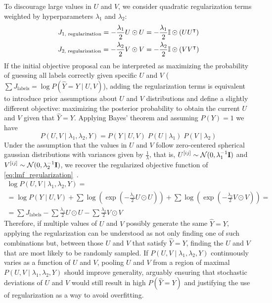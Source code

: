 \begin{apendicesenv}
To discourage large values in $U$ and $V$, we consider quadratic regularization terms weighted by hyperparameters $\lambda_1$ and $\lambda_2$:
%
\begin{gather}
    J_\text{1, regularization}
        = -\frac{\lambda_1}{2} U \odot U
        = -\frac{\lambda_1}{2} \mathbb{I} \odot (UU^\intercal)\\
    J_\text{2, regularization}
        = - \frac{\lambda_2}{2} V \odot V
        = - \frac{\lambda_2}{2} \mathbb{I} \odot (VV^\intercal)
    \label{eq:lmf_regularization}
\end{gather}
%
If the initial objective proposal can be interpreted as maximizing the probability of guessing all labels correctly given specific $U$ and $V$ ($\sum J_\text{labels} = \log P(\hat Y=Y\mid U,V)$), adding the regularization terms is equivalent to introduce prior assumptions about $U$ and $V$ distributions and define a slightly different objective: maximizing the posterior probability to obtain the current $U$ and $V$ given that $\hat Y = Y$. Applying Bayes' theorem and assuming $P(Y) = 1$ we have
%
\begin{equation}
    P(U,V\mid \lambda_1, \lambda_2, Y) = P(Y\mid U,V)\; P(U\mid \lambda_1) \; P(V\mid \lambda_2)
\end{equation}
%
Under the assumption that the values in $U$ and $V$ follow zero-centered spherical gaussian distributions with variances given by $\frac{1}{\lambda}$, that is, $U^{[ij]}\sim\mathcal{N}(0, \lambda_1^{-1}\mathbf{I})$ and $V^{[ij]}\sim\mathcal{N}(0, \lambda_2^{-1}\mathbf{I})$, we recover the regularized objective function of \autoref{eq:lmf_regularization}~\cite{johnsonlogistic}.
%
\begin{multline}
    \log P(U,V\mid \lambda_1, \lambda_2, Y)
    =\\
    = \log P(Y\mid U,V)
        + \sum \log(\exp(-\frac{\lambda_1}{2} U \odot U))
        + \sum \log(\exp(-\frac{\lambda_2}{2} V \odot V))
    =\\
    = \sum J_\text{labels}
        - \sum \frac{\lambda_1}{2} U \odot U
        - \sum \frac{\lambda_2}{2} V \odot V
\end{multline}
%
Therefore, if multiple values of $U$ and $V$ possibly generate the same $\hat Y = Y$, applying the regularization can be understood as not only finding one of such combinations but, between those $U$ and $V$ that satisfy $\hat Y = Y$, finding the $U$ and $V$ that are most likely to be randomly sampled. If $P(U, V\mid \lambda_1, \lambda_2, Y)$ continuously varies as a function of $U$ and $V$, pooling $U$ and $V$ from a region of maximal $P(U, V\mid \lambda_1, \lambda_2, Y)$ should improve generality, arguably ensuring that stochastic deviations of $U$ and $V$ would still result in high $P(\hat Y = Y)$ and justifying the use of regularization as a way to avoid overfitting. %


\end{apendicesenv}
